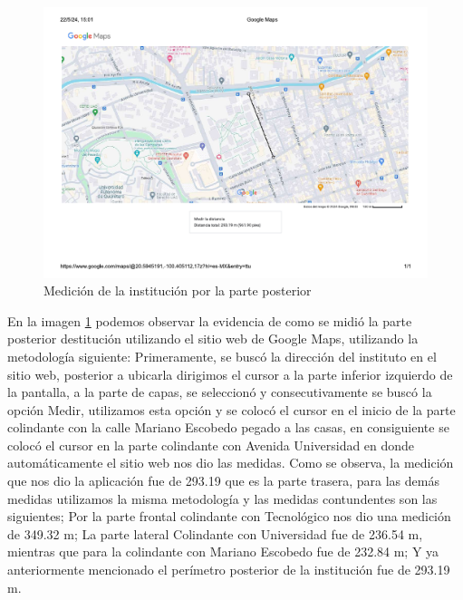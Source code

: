     \begin{figure}[H] 
        \centering
        \includegraphics[trim = {12mm 20mm 10mm 14mm},clip,scale=0.4]{22/Img/evidenciaDeMedicionEnMaps.pdf}
        \caption{Medición de la institución por la parte posterior}
        \label{fig:medicionMaps}
    \end{figure}
    
    En la imagen \ref{fig:medicionMaps} podemos observar la evidencia de como se midió la parte posterior destitución utilizando el sitio web de Google Maps, utilizando la metodología siguiente: Primeramente, se buscó la dirección del instituto en el sitio web, posterior a ubicarla dirigimos el cursor a la parte inferior izquierdo de la pantalla, a la parte de capas, se seleccionó y consecutivamente se buscó la opción Medir, utilizamos esta opción y se colocó el cursor en el inicio de la parte  colindante con la calle Mariano Escobedo pegado a las casas, en consiguiente se colocó el cursor en la parte colindante con Avenida Universidad en donde automáticamente el sitio web nos dio las medidas. Como se observa, la medición que nos dio la aplicación fue de 293.19 que es la parte trasera, para las demás medidas utilizamos la misma metodología y las medidas contundentes son las siguientes; Por la parte frontal colindante con Tecnológico nos dio una medición de 349.32 m; La parte lateral Colindante con Universidad fue de 236.54 m, mientras que para la colindante con Mariano Escobedo fue de 232.84 m; Y ya anteriormente mencionado el perímetro posterior de la institución fue de 293.19 m.
    

